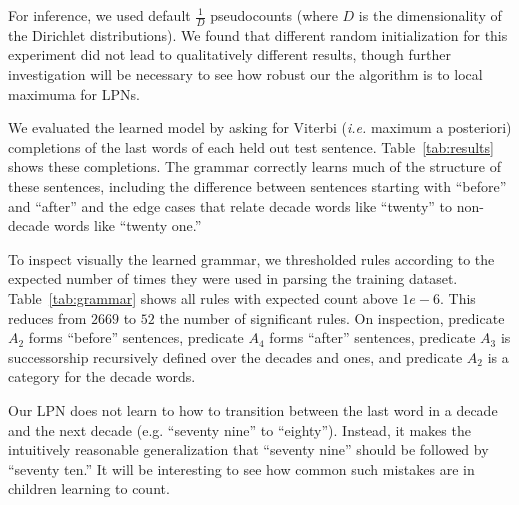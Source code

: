 \documentclass[10pt, twocolumn]{article}
\begin{document}
For inference, we used default $\frac{1}{D}$ pseudocounts (where $D$ is the
dimensionality of the Dirichlet distributions). We found that different random
initialization for this experiment did not lead to qualitatively different
results, though further investigation will be necessary to see how
robust our the algorithm is to local maximuma for LPNs.

We evaluated the learned model by asking for Viterbi ({\it i.e.} maximum a
posteriori) completions of the last words of each held out test
sentence. Table~\ref{tab:results} shows these completions. The grammar
correctly learns much of the structure of these sentences, including
the difference between sentences starting with ``before'' and
``after'' and the edge cases that relate decade words like ``twenty''
to non-decade words like ``twenty one.''

To inspect visually the learned grammar, we thresholded rules
according to the expected number of times they were used in parsing
the training dataset. Table~\ref{tab:grammar} shows all rules with
expected count above $1e-6$. This reduces from $2669$ to $52$ the
number of significant rules. On inspection, predicate $A_2$ forms
``before'' sentences, predicate $A_4$ forms ``after'' sentences,
predicate $A_3$ is successorship recursively defined over the decades
and ones, and predicate $A_2$ is a category for the decade words.

Our LPN does not learn to how to transition between the last word in a decade
and the next decade (e.g. ``seventy nine'' to ``eighty''). Instead, it
makes the intuitively reasonable generalization that ``seventy nine''
should be followed by ``seventy ten.'' It will be interesting to see
how common such mistakes are in children learning to count.
\end{document}
